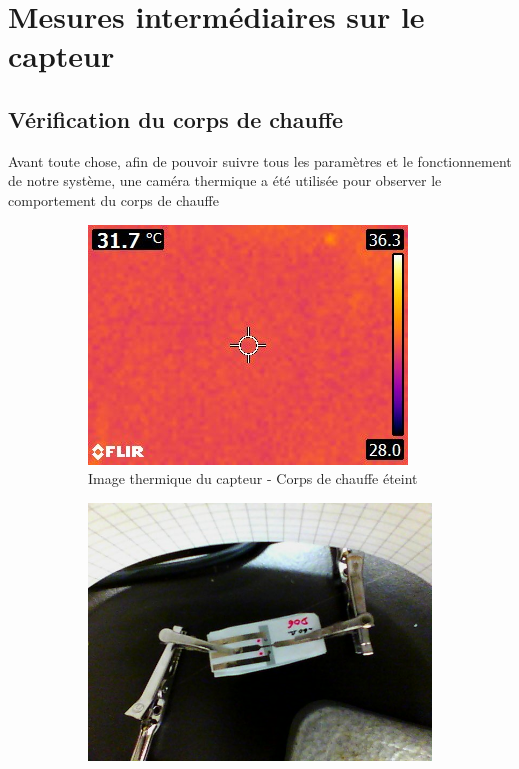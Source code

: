 \section{Mesures intermédiaires sur le capteur}
\label{chap:mesures}
\subsection{Vérification du corps de chauffe}
Avant toute chose, afin de pouvoir suivre tous les paramètres et le fonctionnement de notre système, une caméra thermique a été utilisée
pour observer le comportement du corps de chauffe

\begin{figure}[H]
    \hspace{-0.8 cm}
    \begin{subfigure}{0.3\textwidth}
        \includegraphics[scale = 0.5]{assets/figures/thermique_sans_chauffe.jpg}
        \caption{Image thermique du capteur - Corps de chauffe éteint}
    \end{subfigure}
    \hspace{0.2cm}
    \begin{subfigure}{0.3\textwidth}
        \centering
        \includegraphics[scale = 0.23]{assets/figures/visuel_avec_chauffe.jpg}

\end{subfigure}
\end{figure}
